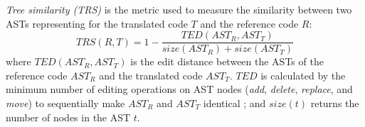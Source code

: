 \textit{Tree similarity (TRS)} is the metric used to measure
the similarity between two ASTs representing for the translated code $T$
and the reference code $R$:
$$TRS(R, T) = 1 -\frac{TED(AST_R, AST_T)}{size(AST_R) + size(AST_T)}$$ where $TED(AST_R, AST_T)$ is the edit
distance between the ASTs of the reference code $AST_R$ and the
translated code $AST_T$. $TED$ is calculated by the minimum number of
editing operations on AST nodes ({\em add}, {\em delete}, {\em
  replace}, and {\em move}) to sequentially make $AST_R$ and $AST_T$
identical \cite{oopsla10}; and $size(t)$ returns the number of
nodes in the AST $t$.
%
%
%

%

